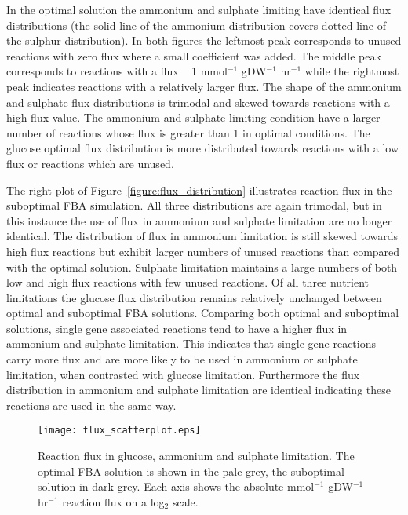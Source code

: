 In the optimal solution the ammonium and sulphate limiting have identical flux distributions (the solid line of the ammonium distribution covers dotted line of the sulphur distribution). In both figures the leftmost peak corresponds to unused reactions with zero flux where a small coefficient was added. The middle peak corresponds to reactions with a flux ~ 1 mmol$^{-1}$ gDW$^{-1}$ hr$^{-1}$ while the rightmost peak indicates reactions with a relatively larger flux. The shape of the ammonium and sulphate flux distributions is trimodal and skewed towards reactions with a high flux value. The ammonium and sulphate limiting condition have a larger number of reactions whose flux is greater than 1 in optimal conditions. The glucose optimal flux distribution is more distributed towards reactions with a low flux or reactions which are unused.

The right plot of Figure~\ref{figure:flux_distribution} illustrates reaction flux in the suboptimal FBA simulation. All three distributions are again trimodal, but in this instance the use of flux in ammonium and sulphate limitation are no longer identical. The distribution of flux in ammonium limitation is still skewed towards high flux reactions but exhibit larger numbers of unused reactions than compared with the optimal solution. Sulphate limitation maintains a large numbers of both low and high flux reactions with few unused reactions. Of all three nutrient limitations the glucose flux distribution remains relatively unchanged between optimal and suboptimal FBA solutions. Comparing both optimal and suboptimal solutions, single gene associated reactions tend to have a higher flux in ammonium and sulphate limitation.  This indicates that single gene reactions carry more flux and are more likely to be used in ammonium or sulphate limitation, when contrasted with glucose limitation. Furthermore the flux distribution in ammonium and sulphate limitation are identical indicating these reactions are used in the same way.



\begin{figure}%
  \centering
  \texttt{[image: flux\_scatterplot.eps]}
  \caption[Reaction flux in glucose, ammonium and sulphate limitation]{Reaction flux in glucose, ammonium and sulphate limitation. The optimal FBA solution is shown in the pale grey, the suboptimal solution in dark grey. Each axis shows the absolute mmol$^{-1}$ gDW$^{-1}$ hr$^{-1}$ reaction flux on a log$_2$ scale. }
  \label{figure:flux_comparison}
\end{figure}%

